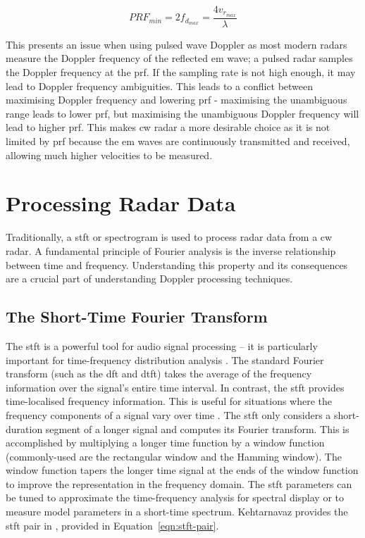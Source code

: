 \documentclass[class=report,11pt,crop=false]{standalone}
\begin{document}
\begin{equation}
    PRF_{min} = 2f_{d_{max}} = \frac{4v_{r_{max}}}{\lambda}
    \label{eqn:prf}
\end{equation}

This presents an issue when using pulsed wave Doppler as most modern radars measure the Doppler frequency of the reflected \gls{em} wave; a pulsed \gls{radar} samples the Doppler frequency at the \gls{prf}. If the sampling rate is not high enough, it may lead to Doppler frequency ambiguities. This leads to a conflict between maximising Doppler frequency and lowering \gls{prf} - maximising the unambiguous range leads to lower \gls{prf}, but maximising  the unambiguous Doppler frequency will lead to higher \gls{prf}. This makes \gls{cw} \gls{radar} a more desirable choice as it is not limited by \gls{prf} because the \gls{em} waves are continuously transmitted and received, allowing much higher velocities to be measured.

\section{Processing Radar Data}
Traditionally, a \gls{stft} or spectrogram is used to process radar data from a \gls{cw} radar. A fundamental principle of Fourier analysis is the inverse relationship between time and frequency. Understanding this property and its consequences are a crucial part of understanding Doppler processing techniques.

\subsection{The Short-Time Fourier Transform}
The \gls{stft} is a powerful tool for audio signal processing – it is particularly important for time-frequency distribution analysis \cite{nasser}. The standard Fourier transform (such as the \gls{dft} and \gls{dtft}) takes the average of the frequency information over the signal’s entire time interval. In contrast, the \gls{stft} provides time-localised frequency information. This is useful for situations where the frequency components of a signal vary over time \cite{nasser, smith}. The \gls{stft} only considers a short-duration segment of a longer signal and computes its Fourier transform. This is accomplished by multiplying a longer time function by a window function (commonly-used are the rectangular window and the Hamming window). The window function tapers the longer time signal at the ends of the window function to improve the representation in the frequency domain. The \gls{stft} parameters can be tuned to approximate the time-frequency analysis for spectral display or to measure model parameters in a short-time spectrum. Kehtarnavaz provides the \gls{stft} pair in \cite{nasser}, provided in Equation~\ref{eqn:stft-pair}.
\end{document}

